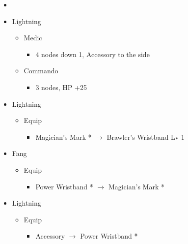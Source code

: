 \begin{menu}
\begin{itemize}
    \paradigm
    \begin{itemize}
        \item {}%
{\paradigmline{\com}{\com}{\rav}}%
{\paradigmline{\rav}{\com}{\rav}}%
{\paradigmline{(\com)}{(\com)}{\rav}}%
{\paradigmline{(\com)}{(\com)}{(\med)}}%
{\paradigmline[5]{\textit{(\com)}}{\textit{(\com)}}{\textit{\syn}}}%
{\paradigmline{(\com)}{\com}{(\med)}}
    \end{itemize}
    \crystarium
    \begin{itemize}
        \item Lightning
        \begin{itemize}
            \item Medic
            \begin{itemize}
                \item 4 nodes down 1, Accessory to the side
            \end{itemize}
            \item Commando
            \begin{itemize}
                \item 3 nodes, HP +25
            \end{itemize}
        \end{itemize}
    \end{itemize}
    \equip
    \begin{itemize}
        \item Lightning
        \begin{itemize}
            \item Equip
            \begin{itemize}
                \item Magician's Mark * $\rightarrow$ Brawler's Wristband Lv 1
            \end{itemize}
        \end{itemize}
        \item Fang
        \begin{itemize}
            \item Equip
            \begin{itemize}
                \item Power Wristband * $\rightarrow$ Magician's Mark *
            \end{itemize}
        \end{itemize}
        \item Lightning
        \begin{itemize}
            \item Equip
            \begin{itemize}
                \item Accessory $\rightarrow$ Power Wristband *
            \end{itemize}
        \end{itemize}
    \end{itemize}
\end{itemize}
\end{menu}

